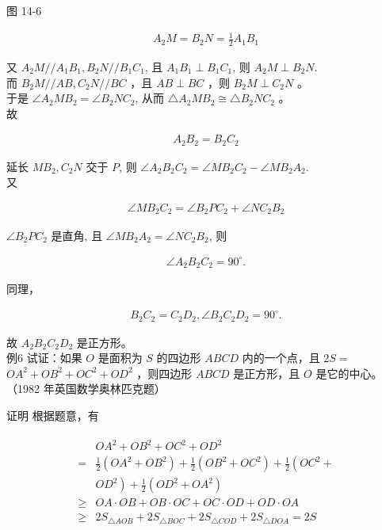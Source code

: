 \documentclass[10pt]{article}
\begin{document}
图 14-6

\begin{align*}
A_{2} M=B_{2} N=\frac{1}{2} A_{1} B_{1}
\end{align*}

又 $A_{2} M / / A_{1} B_{1}, B_{2} N / / B_{1} C_{1}$, 且 $A_{1} B_{1} \perp B_{1} C_{1}$, 则 $A_{2} M \perp B_{2} N$.\\
而 $B_{2} M / / A B, C_{2} N / / B C$ ，且 $A B \perp B C$ ，则 $B_{2} M \perp C_{2} N$ 。\\
于是 $\angle A_{2} M B_{2}=\angle B_{2} N C_{2}$, 从而 $\triangle A_{2} M B_{2} \cong \triangle B_{2} N C_{2}$ 。\\
故

\begin{align*}
A_{2} B_{2}=B_{2} C_{2}
\end{align*}

延长 $M B_{2}, C_{2} N$ 交于 $P$, 则 $\angle A_{2} B_{2} C_{2}=\angle M B_{2} C_{2}-\angle M B_{2} A_{2}$.\\
又

\begin{align*}
\angle M B_{2} C_{2}=\angle B_{2} P C_{2}+\angle N C_{2} B_{2}
\end{align*}

$\angle B_{2} P C_{2}$ 是直角, 且 $\angle M B_{2} A_{2}=\angle N C_{2} B_{2}$, 则

\begin{align*}
\angle A_{2} B_{2} C_{2}=90^{\circ} .
\end{align*}

同理，

\begin{align*}
B_{2} C_{2}=C_{2} D_{2}, \angle B_{2} C_{2} D_{2}=90^{\circ} .
\end{align*}

故 $A_{2} B_{2} C_{2} D_{2}$ 是正方形。\\
例6 试证：如果 $O$ 是面积为 $S$ 的四边形 $A B C D$ 内的一个点，且 $2 S=$ $O A^{2}+O B^{2}+O C^{2}+O D^{2}$ ，则四边形 $A B C D$ 是正方形，且 $O$ 是它的中心。 （1982 年英国数学奥林匹克题）

证明 根据题意，有

\begin{align*}
\begin{aligned}
& O A^{2}+O B^{2}+O C^{2}+O D^{2} \\
= & \frac{1}{2}\left(O A^{2}+O B^{2}\right)+\frac{1}{2}\left(O B^{2}+O C^{2}\right)+\frac{1}{2}\left(O C^{2}+\right. \\
& \left.O D^{2}\right)+\frac{1}{2}\left(O D^{2}+O A^{2}\right) \\
\geqslant & O A \cdot O B+O B \cdot O C+O C \cdot O D+O D \cdot O A \\
\geqslant & 2 S_{\triangle A O B}+2 S_{\triangle B O C}+2 S_{\triangle C O D}+2 S_{\triangle D O A}=2 S
\end{aligned}
\end{align*}
\end{document}
